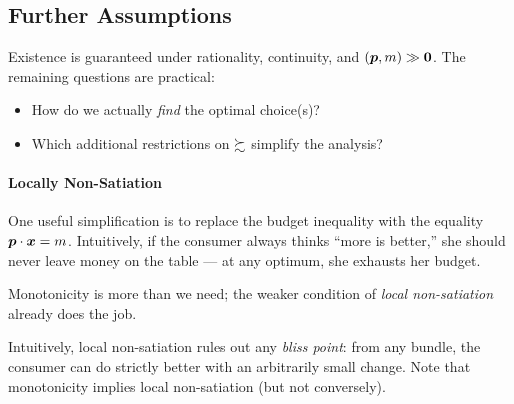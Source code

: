 \subsection{Further Assumptions}\label{further-assumptions}

Existence is guaranteed under rationality, continuity, and
\((\bm p,m)\gg\textbf 0\). The remaining questions are practical:

\begin{itemize}
\item How do we actually \emph{find} the optimal choice(s)?
\item Which additional restrictions on \(\succsim\) simplify the analysis?
\end{itemize}

\paragraph{Locally Non-Satiation}\label{locally-non-satiation}

One useful simplification is to replace the budget inequality with the
equality \(\bm p\cdot \bm x = m\). Intuitively, if the consumer always thinks
``more is better,'' she should never leave money on the table — at any
optimum, she exhausts her budget.


Monotonicity is more than we need; the weaker condition of
\emph{local non-satiation} already does the job.


Intuitively, local non-satiation rules out any \emph{bliss point}: from
any bundle, the consumer can do strictly better with an arbitrarily
small change. Note that monotonicity implies local non-satiation (but
not conversely).

